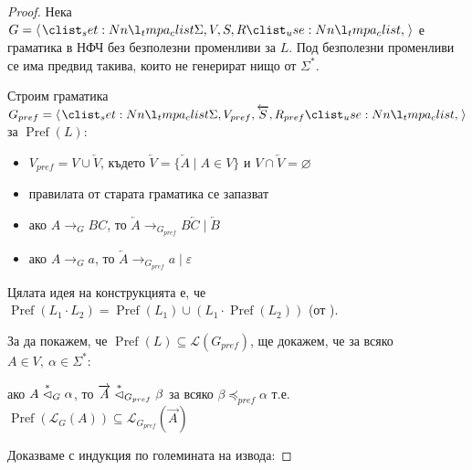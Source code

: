 \begin{proof}
    Нека $G = \opair{\Sigma, V, S, R}$ е граматика в НФЧ без безполезни променливи за $L$.
    Под безполезни променливи се има предвид такива, които не генерират нищо от $\Sigma^*$.

    Строим граматика $G_{pref} = \opair{\Sigma, V_{pref}, \overleftarrow{S}, R_{pref}}$ за $\operatorname{Pref}(L)$:

    \begin{itemize}
        \item $V_{pref} = V \cup \overleftarrow{V}$, където $\overleftarrow{V} = \{ \overleftarrow{A} \mid A \in V \}$ и $V \cap \overleftarrow{V} = \varnothing$
        \item правилата от старата граматика се запазват
        \item ако $A \rightarrow_G BC$, то $\overleftarrow{A} \rightarrow_{G_{pref}} B \overleftarrow{C} \mid \overleftarrow{B}$
        \item ако $A \rightarrow_G a$, то $\overleftarrow{A} \rightarrow_{G_{pref}} a \mid \varepsilon$
    \end{itemize}

    Цялата идея на конструкцията е, че $\operatorname{Pref}(L_1 \cdot L_2) = \operatorname{Pref}(L_1) \cup (L_1 \cdot \operatorname{Pref}(L_2))$ (от ).

    За да покажем, че $\operatorname{Pref}(L) \subseteq \mathcal{L}(G_{pref})$, ще докажем, че за всяко $A \in V, \: \alpha \in \Sigma^*$:

    \begin{center}
        ако $A \stackrel{*}{\vartriangleleft}_G \alpha$, то $\overrightarrow{A} \stackrel{*}{\vartriangleleft}_{G_{pref}} \beta$ за всяко $\beta \preceq_{pref} \alpha$ т.е. $\operatorname{Pref}(\mathcal{L}_G(A)) \subseteq \mathcal{L}_{G_{pref}}(\overrightarrow{A})$
    \end{center}

    Доказваме с индукция по големината на извода:


\end{proof}
